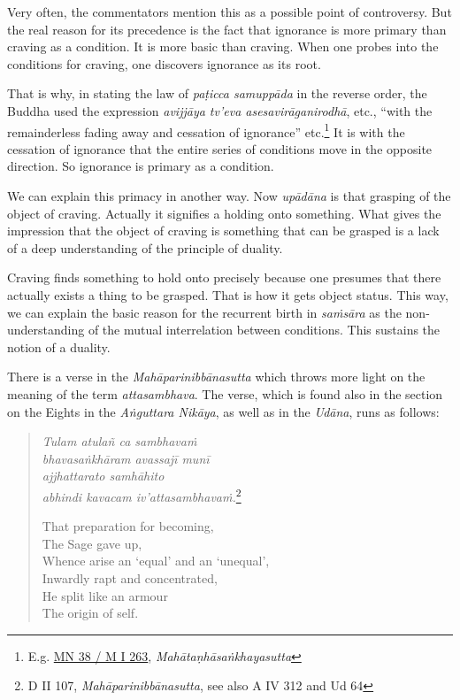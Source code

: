Very often, the commentators mention this as a possible point of controversy. But the real reason for its precedence is the fact that ignorance is more primary than craving as a condition. It is more basic than craving. When one probes into the conditions for craving, one discovers ignorance as its root.

That is why, in stating the law of \emph{paṭicca samuppāda} in the reverse order, the Buddha used the expression \emph{avijjāya tv'eva asesavirāganirodhā}, etc., ``with the remainderless fading away and cessation of ignorance'' etc.\footnote{E.g. \href{https://suttacentral.net/mn38/pli/ms}{MN 38 / M I 263}, \emph{Mahātaṇhāsaṅkhayasutta}} It is with the cessation of ignorance that the entire series of conditions move in the opposite direction. So ignorance is primary as a condition.

We can explain this primacy in another way. Now \emph{upādāna} is that grasping of the object of craving. Actually it signifies a holding onto something. What gives the impression that the object of craving is something that can be grasped is a lack of a deep understanding of the principle of duality.

Craving finds something to hold onto precisely because one presumes that there actually exists a thing to be grasped. That is how it gets object status. This way, we can explain the basic reason for the recurrent birth in \emph{saṁsāra} as the non-understanding of the mutual interrelation between conditions. This sustains the notion of a duality.

There is a verse in the \emph{Mahāparinibbānasutta} which throws more light on the meaning of the term \emph{attasambhava}. The verse, which is found also in the section on the Eights in the \emph{Aṅguttara Nikāya}, as well as in the \emph{Udāna}, runs as follows:

\begin{quote}
\emph{Tulam atulañ ca sambhavaṁ}\\
\emph{bhavasaṅkhāram avassajī munī}\\
\emph{ajjhattarato samhāhito}\\
\emph{abhindi kavacam iv'attasambhavaṁ.}\footnote{D II 107, \emph{Mahāparinibbānasutta}, see also A IV 312 and Ud 64}

That preparation for becoming,\\
The Sage gave up,\\
Whence arise an `equal' and an `unequal',\\
Inwardly rapt and concentrated,\\
He split like an armour\\
The origin of self.
\end{quote}

